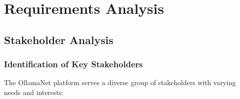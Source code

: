 \def\chapdir{./Chapter03}

\chapter{Requirements Analysis} \label{ch:requirements}

\section{Stakeholder Analysis}

\subsection{Identification of Key Stakeholders}

The OllamaNet platform serves a diverse group of stakeholders with varying needs and interests:

